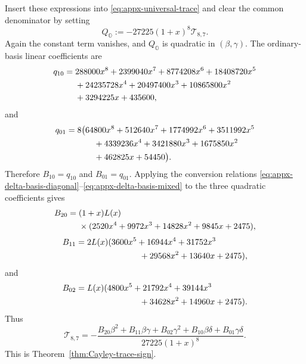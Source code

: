 \documentclass[11pt,reqno]{amsart}
\numberwithin{equation}{section}
\theoremstyle{definition}
\theoremstyle{remark}
\begin{document}
Insert these expressions into \eqref{eq:appx-universal-trace} and clear the
common denominator by setting
\begin{equation}
Q_{\mathbb O}:=-27225(1+x)^8\mathscr T_{8,7}.
\label{eq:appx-cayley-Q}
\end{equation}
Again the constant term vanishes, and $Q_{\mathbb O}$ is quadratic in
$(\beta,\gamma)$.  The ordinary-basis linear coefficients are
\begin{align}
q_{10}
={}&288000x^8+2399040x^7+8774208x^6+18408720x^5\notag\\
&+24235728x^4+20497400x^3+10865800x^2\notag\\
&+3294225x+435600,
\label{eq:appx-cayley-q10}
\end{align}
and
\begin{align}
q_{01}
={}&8\bigl(64800x^8+512640x^7+1774992x^6+3511992x^5\notag\\
&\hspace{0.7cm}+4339236x^4+3421880x^3+1675850x^2\notag\\
&\hspace{0.7cm}+462825x+54450\bigr).
\label{eq:appx-cayley-q01}
\end{align}
Therefore $B_{10}=q_{10}$ and $B_{01}=q_{01}$.  Applying the conversion
relations \eqref{eq:appx-delta-basis-diagonal}--\eqref{eq:appx-delta-basis-mixed}
to the three quadratic coefficients gives
\begin{align}
B_{20}
={}&(1+x)L(x)\notag\\
&\times(2520x^4+9972x^3+14828x^2+9845x+2475),
\label{eq:appx-cayley-B20}
\end{align}
\begin{align}
B_{11}
={}&2L(x)(3600x^5+16944x^4+31752x^3\notag\\
&\hspace{2.2cm}+29568x^2+13640x+2475),
\label{eq:appx-cayley-B11}
\end{align}
and
\begin{align}
B_{02}
={}&L(x)(4800x^5+21792x^4+39144x^3\notag\\
&\hspace{2.2cm}+34628x^2+14960x+2475).
\label{eq:appx-cayley-B02}
\end{align}
Thus
\begin{equation}
\mathscr T_{8,7}
=-\frac{
B_{20}\beta^2+B_{11}\beta\gamma+B_{02}\gamma^2
+B_{10}\beta\delta+B_{01}\gamma\delta
}{27225(1+x)^8}.
\label{eq:appx-cayley-final}
\end{equation}
This is Theorem~\ref{thm:Cayley-trace-sign}.
\end{document}
